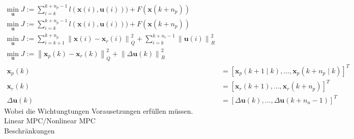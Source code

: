\begin{align}
	\underset{\boldsymbol{u}}{\text{min}}\;J:=\sum_{i=k}^{k+n_p-1}l(\boldsymbol{x}(i),\boldsymbol{u}(i)))+F(\boldsymbol{x}(k+n_p))\\
	\underset{\boldsymbol{u}}{\text{min}}\;J:=\sum_{i=k}^{k+n_p-1}l(\boldsymbol{x}(i),\boldsymbol{u}(i)))+F(\boldsymbol{x}(k+n_p))\\
	\underset{\boldsymbol{u}}{\text{min}}\;J:=\sum_{i=k+1}^{k+n_p}\left \| \boldsymbol{x}(i)-\boldsymbol{x}_r(i)  \right \|_{Q}^{2} +\sum_{i=k}^{k+n_c-1}\left \| \boldsymbol{u}(i) \right \|_{R}^{2}\\
	\underset{\boldsymbol{u}}{\text{min}}\;J:=\left \| \boldsymbol{x}_p(k)-\boldsymbol{x}_r(k)  \right \|_{Q}^{2} +\left \| \Delta\boldsymbol{u}(k) \right \|_{R}^{2}\\
	\boldsymbol{x}_p(k)&=\left [ \boldsymbol{x}_p(k+1\mid k),\dots,\boldsymbol{x}_p(k+n_p\mid k) \right ]^T\\
	\boldsymbol{x}_r(k)&=\left [ \boldsymbol{x}_r(k+1),\dots,\boldsymbol{x}_r(k+n_p) \right ]^T\\
	\Delta\boldsymbol{u}(k)&=\left [ \Delta\boldsymbol{u}(k),\dots,\Delta\boldsymbol{u}(k+n_u-1) \right ]^T
\end{align}
Wobei die Wichtungtungen Vorausetzungen erfüllen müssen.\\
Linear MPC/Nonlinear MPC\\
Beschränkungen
